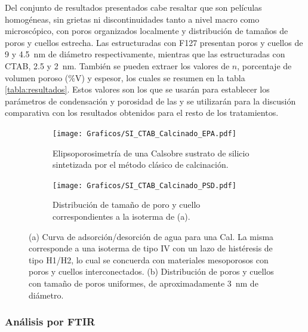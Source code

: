 		

		 	Del conjunto de resultados presentados cabe resaltar que son películas homogéneas, sin grietas ni discontinuidades tanto a nivel macro como microscópico, con poros organizados localmente y distribución de tamaños de poros y cuellos estrecha. Las \pdm\space estructuradas con F127 presentan poros y cuellos de 9 y \SI{4.5}{\nm} de diámetro respectivamente, mientras que las estructuradas con CTAB, 2.5 y \SI{2}{\nm}. También se pueden extraer los valores de $n$, porcentaje de volumen poroso (\%V) y espesor, los cuales se resumen en la tabla \ref{tabla:resultados}. Estos valores son los que se usarán para establecer los parámetros de condensación y porosidad de las \pdm\space y se utilizarán para la discusión comparativa con los resultados obtenidos para el resto de los tratamientos.

		 		\begin{figure}[!h]
		     	  		\begin{subfigure}[t]{0.495\textwidth}
		     	  		\texttt{[image: Graficos/SI\_CTAB\_Calcinado\_EPA.pdf]}
						\caption{Elipsoporosimetría de una Cal\pdmF\space sobre sustrato de silicio sintetizada por el método clásico de calcinación.}
						\label{fig:CTAB_EPA}
						\end{subfigure}
						\begin{subfigure}[t]{0.495\textwidth}
		     	  		\texttt{[image: Graficos/SI\_CTAB\_Calcinado\_PSD.pdf]}
						\caption{Distribución de tamaño de poro y cuello correspondientes a la isoterma de (a).}
						\label{fig:CTAB_PSD}
						\end{subfigure}
						\caption[Elipsoporosimetría para sistemas Cal\pdmC.]{(a) Curva de adsorción/desorción de agua para una Cal\pdmC. La misma corresponde a una isoterma de tipo IV con un lazo de histéresis de tipo H1/H2, lo cual se concuerda con materiales mesoporosos con poros y cuellos interconectados. (b) Distribución de poros y cuellos con tamaño de poros uniformes, de aproximadamente \SI{3}{\nm} de diámetro.}
						\end{figure}

	    \subsubsection{Análisis por FTIR}\label{sec:Analisis_IR}


